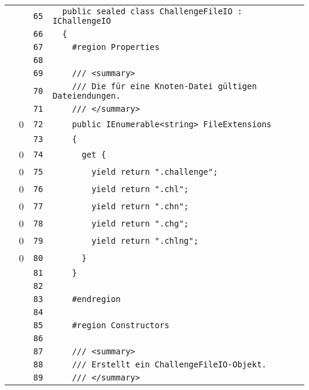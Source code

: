 \documentclass[a4paper,10pt]{article}
\begin{document}
\begin{longtable}[l]{lrrl}
\cellcolor{gray} &  & \verb~65~ & \verb~  public sealed class ChallengeFileIO : IChallengeIO~\\
\cellcolor{gray} &  & \verb~66~ & \verb~  {~\\
\cellcolor{gray} &  & \verb~67~ & \verb~    #region Properties~\\
\cellcolor{gray} &  & \verb~68~ & \verb~~\\
\cellcolor{gray} &  & \verb~69~ & \verb~    /// <summary>~\\
\cellcolor{gray} &  & \verb~70~ & \verb~    /// Die für eine Knoten-Datei gültigen Dateiendungen.~\\
\cellcolor{gray} &  & \verb~71~ & \verb~    /// </summary>~\\
\cellcolor{red} & 0 & \verb~72~ & \verb~    public IEnumerable<string> FileExtensions~\\
\cellcolor{gray} &  & \verb~73~ & \verb~    {~\\
\cellcolor{red} & 0 & \verb~74~ & \verb~      get {~\\
\cellcolor{red} & 0 & \verb~75~ & \verb~        yield return ".challenge";~\\
\cellcolor{red} & 0 & \verb~76~ & \verb~        yield return ".chl";~\\
\cellcolor{red} & 0 & \verb~77~ & \verb~        yield return ".chn";~\\
\cellcolor{red} & 0 & \verb~78~ & \verb~        yield return ".chg";~\\
\cellcolor{red} & 0 & \verb~79~ & \verb~        yield return ".chlng";~\\
\cellcolor{red} & 0 & \verb~80~ & \verb~      }~\\
\cellcolor{gray} &  & \verb~81~ & \verb~    }~\\
\cellcolor{gray} &  & \verb~82~ & \verb~~\\
\cellcolor{gray} &  & \verb~83~ & \verb~    #endregion~\\
\cellcolor{gray} &  & \verb~84~ & \verb~~\\
\cellcolor{gray} &  & \verb~85~ & \verb~    #region Constructors~\\
\cellcolor{gray} &  & \verb~86~ & \verb~~\\
\cellcolor{gray} &  & \verb~87~ & \verb~    /// <summary>~\\
\cellcolor{gray} &  & \verb~88~ & \verb~    /// Erstellt ein ChallengeFileIO-Objekt.~\\
\cellcolor{gray} &  & \verb~89~ & \verb~    /// </summary>~\\

\end{longtable}
\end{document}
